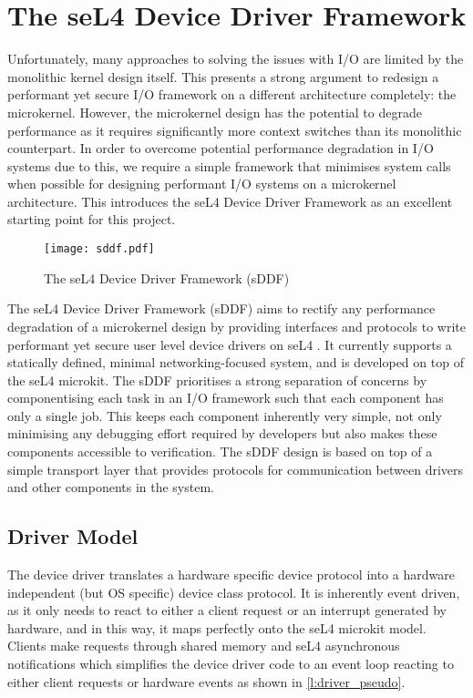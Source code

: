 \chapter{The seL4 Device Driver Framework}\label{ch:sddf}
Unfortunately, many approaches to solving the issues with I/O are limited 
by the monolithic kernel design itself. This presents a strong argument to
redesign a performant yet secure I/O framework on a different architecture completely: the microkernel.
However, the microkernel design has the potential to degrade performance as it requires
significantly more context switches than its monolithic counterpart.
In order to overcome potential performance degradation in I/O systems due to this, we require a simple
framework that minimises system calls when possible for designing performant I/O systems on a microkernel architecture.
This introduces the seL4 Device Driver Framework as an excellent starting point for this project.\\

\begin{figure}[h]
    \centering
    \texttt{[image: sddf.pdf]}
    \caption{The seL4 Device Driver Framework (sDDF) \cite{Parker_22:sddf}}
    \label{f:sddf}
\end{figure}

The seL4 Device Driver Framework (sDDF) aims to rectify any performance degradation of a microkernel
design by providing interfaces and protocols to write performant yet secure user level device
drivers on seL4 \cite{Parker_22:sddf}. It currently supports a statically defined, minimal networking-focused system, and is 
developed on top of the seL4 microkit. The sDDF prioritises a strong separation of 
concerns by componentising each task in an I/O framework such that each component has only a 
single job. This keeps each component inherently very simple, not only minimising any debugging effort required by 
developers but also makes these components accessible to verification. The sDDF design is based on
top of a simple transport layer that provides protocols for communication between drivers and other
components in the system.

\section{Driver Model}\label{s:driver_model}
The device driver translates a hardware specific device protocol into a hardware independent
(but OS specific) device class protocol. It is inherently event driven, as it only needs to react to
either a client request or an interrupt generated by hardware, and in this way, it maps perfectly onto
the seL4 microkit model. Clients make requests through shared memory and seL4 asynchronous notifications
which simplifies the device driver code to an event loop reacting to either client requests or hardware
events as shown in \autoref{l:driver_pseudo}. 


